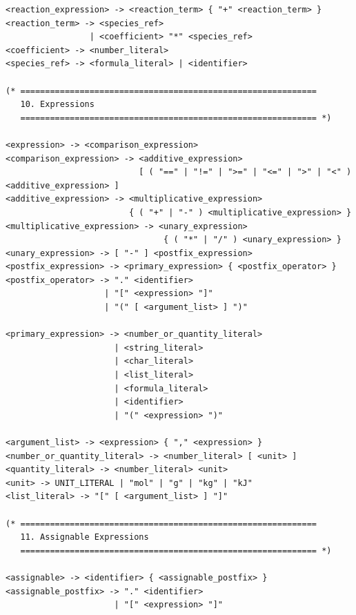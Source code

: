 \documentclass[11pt,a4paper]{article}
\begin{document}
\begin{lstlisting}[style=ebnf]
<reaction_expression> -> <reaction_term> { "+" <reaction_term> }
<reaction_term> -> <species_ref>
                 | <coefficient> "*" <species_ref>
<coefficient> -> <number_literal>
<species_ref> -> <formula_literal> | <identifier>

(* ============================================================
   10. Expressions
   ============================================================ *)

<expression> -> <comparison_expression>
<comparison_expression> -> <additive_expression>
                           [ ( "==" | "!=" | ">=" | "<=" | ">" | "<" ) <additive_expression> ]
<additive_expression> -> <multiplicative_expression>
                         { ( "+" | "-" ) <multiplicative_expression> }
<multiplicative_expression> -> <unary_expression>
                                { ( "*" | "/" ) <unary_expression> }
<unary_expression> -> [ "-" ] <postfix_expression>
<postfix_expression> -> <primary_expression> { <postfix_operator> }
<postfix_operator> -> "." <identifier>
                    | "[" <expression> "]"
                    | "(" [ <argument_list> ] ")"

<primary_expression> -> <number_or_quantity_literal>
                      | <string_literal>
                      | <char_literal>
                      | <list_literal>
                      | <formula_literal>
                      | <identifier>
                      | "(" <expression> ")"

<argument_list> -> <expression> { "," <expression> }
<number_or_quantity_literal> -> <number_literal> [ <unit> ]
<quantity_literal> -> <number_literal> <unit>
<unit> -> UNIT_LITERAL | "mol" | "g" | "kg" | "kJ"
<list_literal> -> "[" [ <argument_list> ] "]"

(* ============================================================
   11. Assignable Expressions
   ============================================================ *)

<assignable> -> <identifier> { <assignable_postfix> }
<assignable_postfix> -> "." <identifier>
                      | "[" <expression> "]"
\end{lstlisting}
\end{document}

